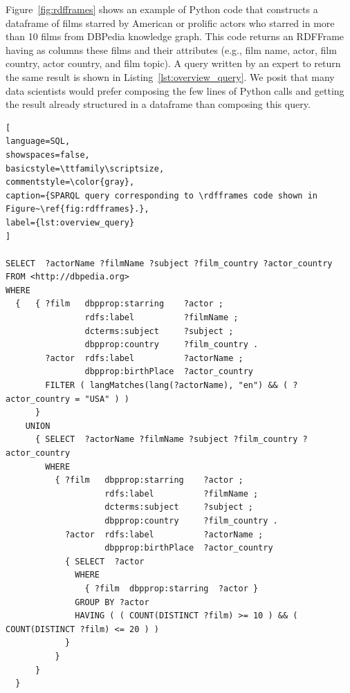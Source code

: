 Figure~\ref{fig:rdfframes} shows an example of \rdfframes Python code that constructs a dataframe of films starred by American or prolific actors who starred in more than 10 films from DBPedia knowledge graph. 
This code returns an RDFFrame having as columns these films and their attributes (e.g., film name, actor, film country, actor country, and film topic). 
A \sparql query written by an expert to return the same result is shown in Listing~\ref{lst:overview_query}. 
We posit that many data scientists would prefer composing the few lines of Python calls and getting the result already structured in a dataframe than composing this \sparql query.

\begin{lstlisting}[
language=SQL,
showspaces=false,
basicstyle=\ttfamily\scriptsize,
commentstyle=\color{gray},
caption={SPARQL query corresponding to \rdfframes code shown in Figure~\ref{fig:rdfframes}.},
label={lst:overview_query}
]

SELECT  ?actorName ?filmName ?subject ?film_country ?actor_country
FROM <http://dbpedia.org>
WHERE
  {   { ?film   dbpprop:starring    ?actor ;
                rdfs:label          ?filmName ;
                dcterms:subject     ?subject ;
                dbpprop:country     ?film_country .
        ?actor  rdfs:label          ?actorName ;
                dbpprop:birthPlace  ?actor_country
        FILTER ( langMatches(lang(?actorName), "en") && ( ?actor_country = "USA" ) )
      }
    UNION
      { SELECT  ?actorName ?filmName ?subject ?film_country ?actor_country
        WHERE
          { ?film   dbpprop:starring    ?actor ;
                    rdfs:label          ?filmName ;
                    dcterms:subject     ?subject ;
                    dbpprop:country     ?film_country .
            ?actor  rdfs:label          ?actorName ;
                    dbpprop:birthPlace  ?actor_country
            { SELECT  ?actor
              WHERE
                { ?film  dbpprop:starring  ?actor }
              GROUP BY ?actor
              HAVING ( ( COUNT(DISTINCT ?film) >= 10 ) && ( COUNT(DISTINCT ?film) <= 20 ) )
            }
          }
      }
  }
\end{lstlisting}

